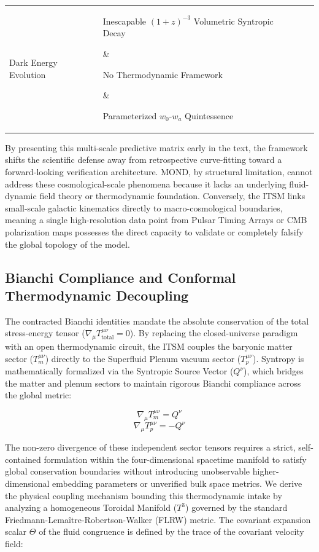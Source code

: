 \documentclass[aps,prd,10pt,onecolumn,superscriptaddress,nofootinbib]{revtex4-2}
\begin{document}
\begin{table}[htbp]
\begin{ruledtabular}
\begin{tabular}{l|l|l|l}
Dark Energy Evolution & \parbox[t]{4.5cm}{Inescapable $(1+z)^{-3}$ Volumetric Syntropic Decay\vspace{1.5mm}} & \parbox[t]{3.5cm}{No Thermodynamic Framework\vspace{1.5mm}} & \parbox[t]{4cm}{Parameterized $w_0$-$w_a$ Quintessence\vspace{1.5mm}} \\
\end{tabular}
\end{ruledtabular}
\end{table}

By presenting this multi-scale predictive matrix early in the text, the framework shifts the scientific defense away from retrospective curve-fitting toward a forward-looking verification architecture. MOND, by structural limitation, cannot address these cosmological-scale phenomena because it lacks an underlying fluid-dynamic field theory or thermodynamic foundation. Conversely, the ITSM links small-scale galactic kinematics directly to macro-cosmological boundaries, meaning a single high-resolution data point from Pulsar Timing Arrays or CMB polarization maps possesses the direct capacity to validate or completely falsify the global topology of the model.

\subsection{\label{sec:bianchi}Bianchi Compliance and Conformal Thermodynamic Decoupling}

The contracted Bianchi identities mandate the absolute conservation of the total stress-energy tensor ($\nabla_\mu T_{\text{total}}^{\mu\nu} = 0$). By replacing the closed-universe paradigm with an open thermodynamic circuit, the ITSM couples the baryonic matter sector ($T_m^{\mu\nu}$) directly to the Superfluid Plenum vacuum sector ($T_p^{\mu\nu}$). Syntropy is mathematically formalized via the Syntropic Source Vector ($Q^\nu$), which bridges the matter and plenum sectors to maintain rigorous Bianchi compliance across the global metric:

\begin{equation}
\nabla_\mu T_m^{\mu\nu} = Q^\nu
\end{equation}
\begin{equation}
\nabla_\mu T_p^{\mu\nu} = -Q^\nu
\end{equation}

The non-zero divergence of these independent sector tensors requires a strict, self-contained formulation within the four-dimensional spacetime manifold to satisfy global conservation boundaries without introducing unobservable higher-dimensional embedding parameters or unverified bulk space metrics. We derive the physical coupling mechanism bounding this thermodynamic intake by analyzing a homogeneous Toroidal Manifold ($T^3$) governed by the standard Friedmann-Lemaître-Robertson-Walker (FLRW) metric. The covariant expansion scalar $\Theta$ of the fluid congruence is defined by the trace of the covariant velocity field:
\end{document}

